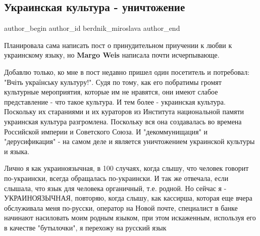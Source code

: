  
 
 
 
 
 
\subsection{Украинская культура - уничтожение}
\label{sec:26_07_2021.fb.berdnik_miroslava.1.kultura_unichtozhenie}
 
\ifcmt
 author_begin
   author_id berdnik_miroslava
 author_end
\fi

Планировала сама написать пост о принудительном приучении к любви к украинскому
языку, но \textbf{Margo Weis} написала почти исчерпывающе.

Добавлю только, ко мне в пост недавно пришел один посетитель и потребовал:
"Вчіть українську культуру!". Судя по тому, как его побратимы громят культурные
мероприятия, которые им не нравятся, они имеют слабое представление - что такое
культура. И тем более - украинская культура. Поскольку их стараниями и их
кураторов из Института национальной памяти украинская культура разгромлена.
Поскольку вся она создавалась во времена Российской империи и Советского Союза.
И "декоммунищация" и "дерусификация" - на самом деле и является уничтожением
украинской культуры и языка.

Лично я как украиноязычная, в 100 случаях, когда слышу, что человек говорит
по-украински, всегда обращалась по-украински. И так же отвечала, если слышала,
что язык для человека органичный, т.е. родной.  Но сейчас я - УКРАИНОЯЗЫЧНАЯ,
повторяю, когда слышу, как кассирша, которая еще вчера обслуживала меня
по-русски, оператор на Новой почте, специалист в банке начинают насиловать моим
родным языком, при этом искаженным, используя его в качестве "бутылочки", я
перехожу на русский язык

